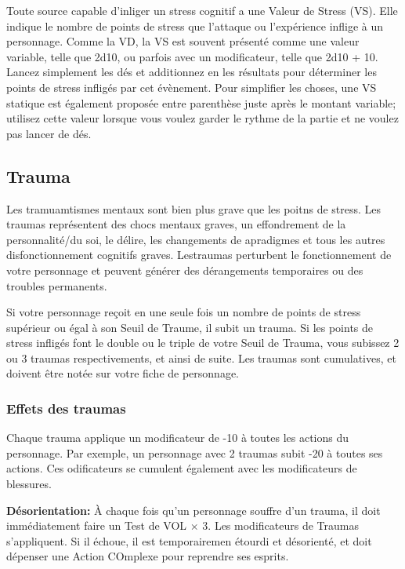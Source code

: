 Toute source capable d'inliger un stress cognitif a une Valeur de Stress (VS). Elle indique le nombre de points de stress que l'attaque ou l'expérience inflige à un personnage. Comme la VD, la VS est souvent présenté comme une valeur variable, telle que 2d10, ou parfois avec un modificateur, telle que 2d10 + 10. Lancez simplement les dés et additionnez en les résultats pour déterminer les points de stress  infligés par cet évènement. Pour simplifier les choses, une VS statique est également proposée entre parenthèse juste après le montant variable; utilisez cette valeur lorsque vous voulez garder le rythme de la partie et ne voulez pas lancer de dés. 



\subsection{Trauma} \label{sec:trauma} 

Les tramuamtismes mentaux sont bien plus grave que les poitns de stress. Les traumas représentent des chocs mentaux graves, un effondrement de la personnalité/du soi, le délire, les changements de apradigmes et tous les autres disfonctionnement cognitifs graves. Lestraumas perturbent le fonctionnement de votre personnage et peuvent générer des dérangements temporaires ou des troubles permanents. 

Si votre personnage reçoit en une seule fois un nombre de points de stress supérieur ou égal à son Seuil de Traume, il subit un trauma. Si les points de stress infligés font le double ou le triple de votre Seuil de Trauma, vous subissez 2 ou 3 traumas respectivements, et ainsi de suite. Les traumas sont cumulatives, et doivent être notée sur votre fiche de personnage. 

\subsubsection{Effets des traumas} 

Chaque trauma applique un modificateur de -10 à toutes les actions du personnage. Par exemple, un personnage avec 2 traumas subit -20 à toutes ses actions. Ces odificateurs se cumulent également avec les modificateurs de blessures. 

\textbf{Désorientation:} À chaque fois qu'un personnage souffre d'un trauma, il doit immédiatement faire un Test de VOL $\times$ 3. Les modificateurs de Traumas s'appliquent. Si il échoue, il est temporairemen étourdi et désorienté, et doit dépenser une Action COmplexe pour reprendre ses esprits. 


